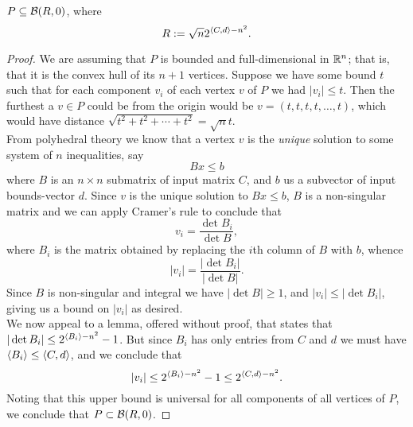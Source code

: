 \begin{lemma}\label{lemma:encoding-length-radius}
  \(P \subseteq \mathcal{B}(R, 0)\), where 
  \begin{equation}\label{eq:encoding-length-radius}
    R := \sqrt{n}2^{\langle {C, d} \rangle - n^2}.
  \end{equation}
  \begin{proof}
      We are assuming that \(P\) is bounded and full-dimensional in \(\mathbb R^n\);
      that is, that it is the convex hull of its \(n+1\) vertices.  Suppose we
      have some bound \(t\) such that for each component \(v_i\) of each vertex
      \(v\) of \(P\) we had \(|v_i| \leq t\).  Then the furthest a \(v \in P\)
      could be from the origin would be \(v = (t,t,t,t,\ldots, t)\), which would
      have distance \(\sqrt{t^2 + t^2 + \cdots + t^2} = \sqrt{n} t\).\\

      From polyhedral theory we know that a vertex \(v\) is the
      \textit{unique} solution to some system of \(n\) inequalities, say
      \[Bx \leq b\]
      where \(B\) is an \(n\times n\) submatrix of input matrix \(C\), and \(b\)
      us a subvector of input bounds-vector \(d\). Since \(v\) is the unique
      solution to \(Bx \leq b\), \(B\) is a non-singular matrix and we can apply
      Cramer's rule to conclude that
      \[v_i = \frac{\det{B_i}}{\det{B}},\]
      where \(B_i\) is the matrix obtained by replacing the \(i\)th column of
      \(B\) with \(b\), whence 
      \[|v_i| = \frac{|\det{B_i}|}{|\det{B}|}.\]
      Since \(B\) is non-singular and integral we have \(|\det{B}| \geq 1\), and
      \(|v_i| \leq |\det B_i|\), giving us a bound on \(|v_i|\) as desired.\\

      We now appeal to a lemma, offered without proof, that states that \(|\det
      B_i| \leq 2^{\langle {B_i} \rangle - n^2} - 1\). But since \(B_i\) has only
      entries from \(C\) and \(d\) we must have \(\langle {B_i} \rangle \leq
      \langle {C,d} \rangle\), and we conclude that
      \[|v_i| \leq 2^{\langle {B_i} \rangle - n^2} - 1 \leq 2^{\langle {C,d} \rangle - n^2}.\]
      Noting that this upper bound is universal for all components of all
      vertices of \(P\), we conclude that \(P \subset \mathcal{B}(R, 0)\).
  \end{proof}
\end{lemma}

